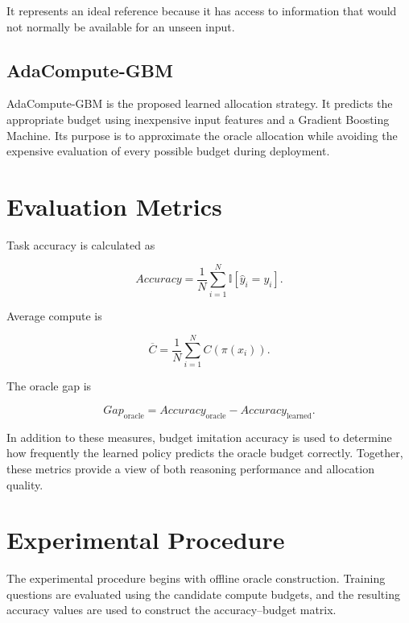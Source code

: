 \documentclass[12pt,a4paper,titlepage]{report}
\begin{document}
It represents an ideal reference because it has access to information that would not normally be available for an unseen input.

\subsection{AdaCompute-GBM}

AdaCompute-GBM is the proposed learned allocation strategy. It predicts the appropriate budget using inexpensive input features and a Gradient Boosting Machine. Its purpose is to approximate the oracle allocation while avoiding the expensive evaluation of every possible budget during deployment.

\section{Evaluation Metrics}

Task accuracy is calculated as

\begin{equation}
Accuracy
=
\frac{1}{N}
\sum_{i=1}^{N}
\mathbb{I}
[\hat{y}_i=y_i].
\end{equation}

Average compute is

\begin{equation}
\overline{C}
=
\frac{1}{N}
\sum_{i=1}^{N}
C(\pi(x_i)).
\end{equation}

The oracle gap is

\begin{equation}
Gap_{\mathrm{oracle}}
=
Accuracy_{\mathrm{oracle}}
-
Accuracy_{\mathrm{learned}}.
\end{equation}

In addition to these measures, budget imitation accuracy is used to determine how frequently the learned policy predicts the oracle budget correctly. Together, these metrics provide a view of both reasoning performance and allocation quality.

\section{Experimental Procedure}

The experimental procedure begins with offline oracle construction. Training questions are evaluated using the candidate compute budgets, and the resulting accuracy values are used to construct the accuracy--budget matrix.
\end{document}
